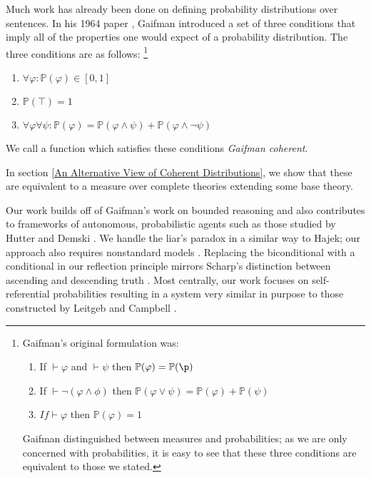 \documentclass[12pt]{article}
\newcommand{\PP}{\mathbb{P}}
\theoremstyle{plain}
\theoremstyle{definition}
\theoremstyle{remark}
\begin{document}
Much work has already been done on defining probability distributions over sentences. In his 1964 paper \cite{gaifman64}, Gaifman introduced a set of three conditions that imply all of the properties one would expect of a probability distribution. The three conditions are as follows: 
\footnote{Gaifman's original formulation was:
\begin{enumerate}
\item If $\vdash \varphi$ and $\vdash \psi$ then $\PP(\varphi)=\PP(\p)$
\item If $\vdash \neg (\varphi \wedge \phi)$ then $\PP(\varphi \vee \psi) = \PP(\varphi) + \PP(\psi)$
\item $If \vdash \varphi$ then $\PP(\varphi) = 1$
\end{enumerate}
Gaifman distinguished between measures and probabilities; as we are only concerned with probabilities, it is easy to see that these three conditions are equivalent to those we stated.}

\begin{enumerate}
\item $\forall \varphi: \PP(\varphi) \in [0,1]$
\item $\PP(\top) = 1$
\item $\forall \varphi \forall \psi: \PP(\varphi) = \PP(\varphi \wedge \psi) + \PP(\varphi \wedge \neg \psi)$
\end{enumerate}
We call a function which satisfies these conditions \emph{Gaifman coherent}.

In section \ref{An Alternative View of Coherent Distributions}, we show that these are equivalent to a measure over complete theories extending some base theory.


% 


Our work builds off of Gaifman's work on bounded reasoning \cite{gaifman04} and also contributes 
to frameworks of autonomous, probabilistic agents such as those studied by Hutter and Demski
\cite{hutter13,demski12}.
We handle the liar's paradox in a similar way to Hajek; our approach also requires nonstandard models \cite{hajek98}.
Replacing the biconditional with a conditional in our reflection principle mirrors Scharp's distinction between ascending and descending truth \cite{scharp13}.
Most centrally, our work focuses on self-referential probabilities resulting in a system very similar in purpose to those constructed by Leitgeb and Campbell \cite{leitgeb08,leitgeb12a,leitgeb12b,campbell14}.
\end{document}
